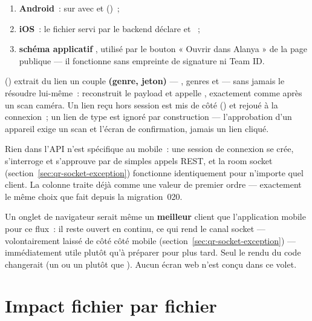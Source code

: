\begin{enumerate}[leftmargin=1.6em]
  \item \textbf{Android}~:  sur
         avec   et 
        ()~;
  \item \textbf{iOS}~: le fichier  servi par le backend
        déclare  et ~;
  \item \textbf{schéma applicatif} , utilisé par le
        bouton « Ouvrir dans Alanya » de la page publique --- il fonctionne sans
        empreinte de signature ni Team ID.
\end{enumerate}

 () extrait du lien un couple
\textbf{(genre, jeton)} --- , genres  et  ---
sans jamais le résoudre lui-même~:  reconstruit le payload et
appelle , exactement comme après un scan caméra. Un lien reçu
hors session est mis de côté () et rejoué à la connexion~; un lien de
type  est ignoré par construction --- l'approbation d'un appareil exige un
scan et l'écran de confirmation, jamais un lien cliqué.
\label{ch:qr-web}

Rien dans l'API n'est spécifique au mobile~: une session de connexion se crée, s'interroge
et s'approuve par de simples appels REST, et la room socket
 (section~\ref{sec:qr-socket-exception}) fonctionne
identiquement pour n'importe quel client. La colonne  traite déjà
 comme une valeur de premier ordre --- exactement le même choix que fait
 depuis la migration~020.

Un onglet de navigateur serait même un \textbf{meilleur} client que l'application mobile
pour ce flux~: il reste ouvert en continu, ce qui rend le canal socket --- volontairement
laissé de côté côté mobile (section~\ref{sec:qr-socket-exception}) --- immédiatement utile
plutôt qu'à préparer pour plus tard. Seul le rendu du code changerait (un  ou
un  plutôt que ). Aucun écran web n'est conçu dans ce volet.

\chapter{Impact fichier par fichier}

